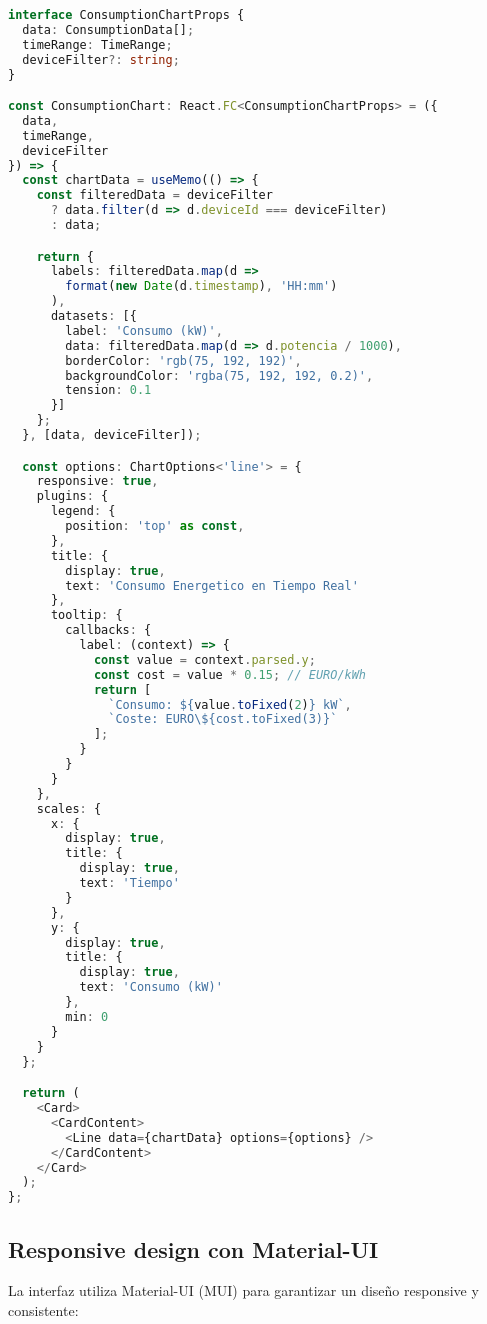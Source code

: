 \begin{lstlisting}[language=TypeScript, caption=Componente de gráfico de consumo]
interface ConsumptionChartProps {
  data: ConsumptionData[];
  timeRange: TimeRange;
  deviceFilter?: string;
}

const ConsumptionChart: React.FC<ConsumptionChartProps> = ({
  data,
  timeRange,
  deviceFilter
}) => {
  const chartData = useMemo(() => {
    const filteredData = deviceFilter 
      ? data.filter(d => d.deviceId === deviceFilter)
      : data;

    return {
      labels: filteredData.map(d => 
        format(new Date(d.timestamp), 'HH:mm')
      ),
      datasets: [{
        label: 'Consumo (kW)',
        data: filteredData.map(d => d.potencia / 1000),
        borderColor: 'rgb(75, 192, 192)',
        backgroundColor: 'rgba(75, 192, 192, 0.2)',
        tension: 0.1
      }]
    };
  }, [data, deviceFilter]);

  const options: ChartOptions<'line'> = {
    responsive: true,
    plugins: {
      legend: {
        position: 'top' as const,
      },
      title: {
        display: true,
        text: 'Consumo Energetico en Tiempo Real'
      },
      tooltip: {
        callbacks: {
          label: (context) => {
            const value = context.parsed.y;
            const cost = value * 0.15; // EURO/kWh
            return [
              `Consumo: ${value.toFixed(2)} kW`,
              `Coste: EURO\${cost.toFixed(3)}`
            ];
          }
        }
      }
    },
    scales: {
      x: {
        display: true,
        title: {
          display: true,
          text: 'Tiempo'
        }
      },
      y: {
        display: true,
        title: {
          display: true,
          text: 'Consumo (kW)'
        },
        min: 0
      }
    }
  };

  return (
    <Card>
      <CardContent>
        <Line data={chartData} options={options} />
      </CardContent>
    </Card>
  );
};
\end{lstlisting}

\subsection{Responsive design con Material-UI}

La interfaz utiliza Material-UI (MUI) para garantizar un diseño responsive y consistente:

